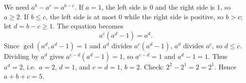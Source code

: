 We need $a^b-a^c=a^{b-c}$. If $a=1$, the left side is $0$ and the right side is $1$, so $a\ge2$. If $b\le c$, the left side is at most $0$ while the right side is positive, so $b>c$; let $d=b-c\ge1$. The equation becomes
\[
a^c\left(a^d-1\right)=a^d .
\]
Since $\gcd\left(a^d,a^d-1\right)=1$ and $a^d$ divides $a^c\left(a^d-1\right)$, $a^d$ divides $a^c$, so $d\le c$. Dividing by $a^d$ gives $a^{c-d}\left(a^d-1\right)=1$, so $a^{c-d}=1$ and $a^d-1=1$. Thus $a^d=2$, i.e.\ $a=2$, $d=1$, and $c=d=1$, $b=2$. Check: $2^2-2^1=2=2^{1}$. Hence $a+b+c=\boxed{5}$.
